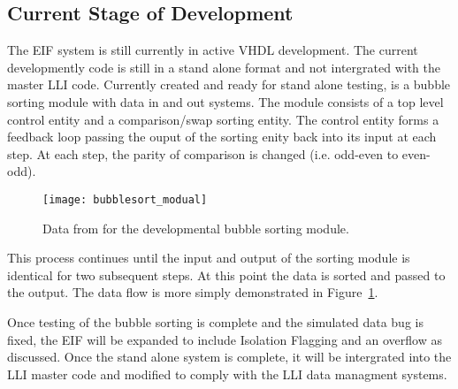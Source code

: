 	\subsection{Current Stage of Development} 
		The EIF system is still currently in active VHDL development.
		The current developmently code is still in a stand alone format and not intergrated with the master LLI code.
		Currently created and ready for stand alone testing, is a bubble sorting module with data in and out systems.
		The module consists of a top level control entity and a comparison/swap sorting entity.
		The control entity forms a feedback loop passing the ouput of the sorting enity back into its input at each step.
		At each step, the parity of comparison is changed (i.e. odd-even to even-odd).
		\begin{figure}[h]
			\centering
			\texttt{[image: bubblesort\_modual]}
			\caption{Data from for the developmental bubble sorting module.}
			\label{fig:bubble_data_flow}
		\end{figure}
		\par
		This process continues until the input and output of the sorting module is identical for two subsequent steps.
		At this point the data is sorted and passed to the output.
		The data flow is more simply demonstrated in Figure~\ref{fig:bubble_data_flow}.
		\par
		Once testing of the bubble sorting is complete and the simulated data bug is fixed, the EIF will be expanded to include Isolation Flagging and an overflow as discussed.
		Once the stand alone system is complete, it will be intergrated into the LLI master code and modified to comply with the LLI data managment systems.

		\FloatBarrier